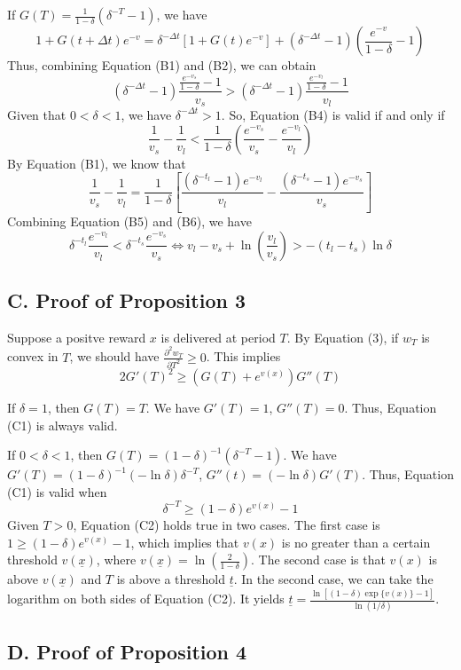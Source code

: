 \documentclass[
  12pt,
]{article}
\begin{document}
If \(G(T) = \frac{1}{1-\delta}(\delta^{-T}-1)\), we have\[
1+G(t+\Delta t)e^{-v} = \delta^{-\Delta t}[1+G(t)e^{-v}]+(\delta^{-\Delta t}-1)(\frac{e^{-v}}{1-\delta}-1)
\] Thus, combining Equation (B1) and (B2), we can obtain\[\tag{B4}
(\delta^{-\Delta t}-1)\frac{\frac{e^{-v_s}}{1-\delta}-1}{v_s} >
(\delta^{-\Delta t}-1)\frac{\frac{e^{-v_l}}{1-\delta}-1}{v_l}
\] Given that \(0<\delta<1\), we have \(\delta^{-\Delta t}>1\). So,
Equation (B4) is valid if and only if\[\tag{B5}
\frac{1}{v_s}-\frac{1}{v_l}<\frac{1}{1-\delta}(\frac{e^{-v_s}}{v_s}-\frac{e^{-v_l}}{v_l})
\] By Equation (B1), we know that\[\tag{B6}
\frac{1}{v_s}-\frac{1}{v_l}=\frac{1}{1-\delta}\left[\frac{(\delta^{-t_l}-1)e^{-v_l}}{v_l} -\frac{(\delta^{-t_s}-1)e^{-v_s}}{v_s}\right]
\] Combining Equation (B5) and (B6), we have\[
\delta^{-t_l}\frac{e^{-v_l}}{v_l}<\delta^{-t_s}\frac{e^{-v_s}}{v_s} \Longleftrightarrow v_l - v_s + \ln \left(\frac{v_l}{v_s}\right)>-(t_l-t_s)\ln\delta
\]

\hypertarget{c.-proof-of-proposition-3}{%
\subsection*{C. Proof of Proposition
3}\label{c.-proof-of-proposition-3}}

Suppose a positve reward \(x\) is delivered at period \(T\). By Equation
(3), if \(w_T\) is convex in \(T\), we should have
\(\frac{\partial^2 w_T}{\partial T^2}\geq 0\). This
implies\[\tag{C1} 2G'(T)^2\geq(G(T)+e^{v(x)})G''(T) \]

If \(\delta=1\), then \(G(T)=T\). We have \(G'(T)=1\), \(G''(T)=0\).
Thus, Equation (C1) is always valid.

If \(0<\delta<1\), then \(G(T)=(1-\delta)^{-1}(\delta^{-T}-1)\). We have
\(G'(T)=(1-\delta)^{-1}(-\ln\delta)\delta^{-T}\),
\(G''(t)=(-\ln\delta)G'(T)\). Thus, Equation (C1) is valid when
\[\tag{C2} \delta^{-T}\geq(1-\delta)e^{v(x)}-1 \]Given \(T>0\), Equation
(C2) holds true in two cases. The first case is
\(1\geq (1-\delta)e^{v(x)}-1\), which implies that \(v(x)\) is no
greater than a certain threshold \(v(\underline{x})\), where
\(v(\underline{x})=\ln(\frac{2}{1-\delta})\). The second case is that
\(v(x)\) is above \(v(\underline{x})\) and \(T\) is above a threshold
\(\underline{t}\). In the second case, we can take the logarithm on both
sides of Equation (C2). It yields
\(\underline{t}=\frac{\ln[(1-\delta)\exp\{v(x)\}-1]}{\ln(1/\delta)}\).

\hypertarget{d.-proof-of-proposition-4}{%
\subsection*{D. Proof of Proposition
4}\label{d.-proof-of-proposition-4}}
\end{document}
